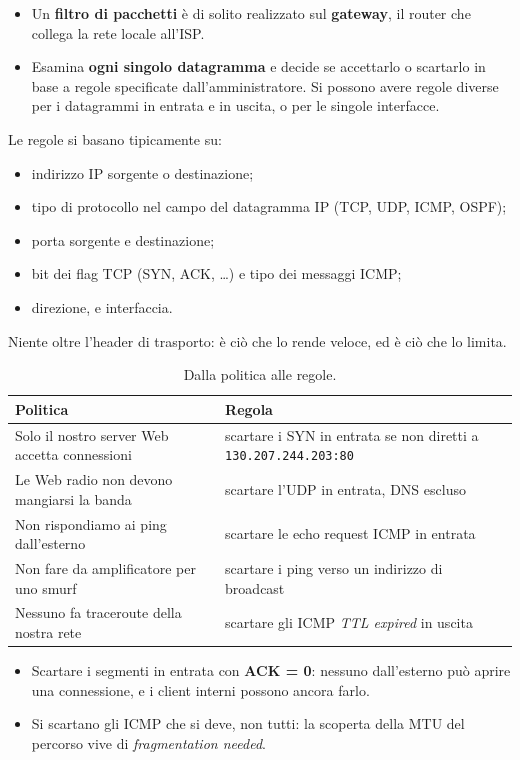 \begin{itemize}
    \item Un \textbf{filtro di pacchetti} è di solito realizzato sul \textbf{gateway}, il router che collega la rete locale all'ISP.
    \item Esamina \textbf{ogni singolo datagramma} e decide se accettarlo o scartarlo in base a regole specificate dall'amministratore. Si possono avere
          regole diverse per i datagrammi in entrata e in uscita, o per le singole interfacce.
\end{itemize}

Le regole si basano tipicamente su:

\begin{itemize}
    \item indirizzo IP sorgente o destinazione;
    \item tipo di protocollo nel campo del datagramma IP (TCP, UDP, ICMP, OSPF);
    \item porta sorgente e destinazione;
    \item bit dei flag TCP (SYN, ACK, \dots) e tipo dei messaggi ICMP;
    \item direzione, e interfaccia.
\end{itemize}

Niente oltre l'header di trasporto: è ciò che lo rende veloce, ed è ciò che lo limita.

\begin{table}[H]
\centering
\begin{tabular}{p{6cm}p{8cm}}
\toprule
\textbf{Politica} & \textbf{Regola} \\
\midrule
Solo il nostro server Web accetta connessioni & scartare i SYN in entrata se non diretti a \texttt{130.207.244.203:80} \\
Le Web radio non devono mangiarsi la banda & scartare l'UDP in entrata, DNS escluso \\
Non rispondiamo ai ping dall'esterno & scartare le echo request ICMP in entrata \\
Non fare da amplificatore per uno smurf & scartare i ping verso un indirizzo di broadcast \\
Nessuno fa traceroute della nostra rete & scartare gli ICMP \emph{TTL expired} in uscita \\
\bottomrule
\end{tabular}
\caption{Dalla politica alle regole.}
\end{table}

\begin{itemize}
    \item Scartare i segmenti in entrata con \textbf{ACK = 0}: nessuno dall'esterno può aprire una connessione, e i client interni
          possono ancora farlo.
    \item Si scartano gli ICMP che si deve, non tutti: la scoperta della MTU del percorso vive di \emph{fragmentation needed}.
\end{itemize}


